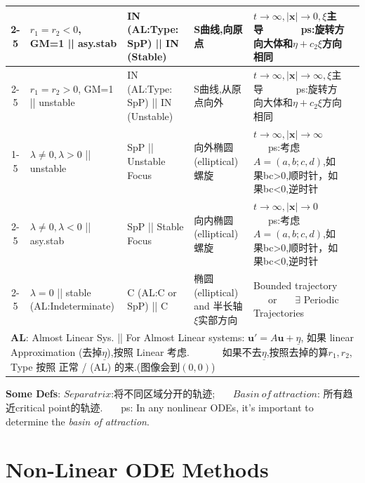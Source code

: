 \documentclass[8pt]{extarticle}
\begin{document}
\begin{longtable}{|c|l|l|l|l|l|}
    \cline{2-5}
    & {\scriptsize $r_1=r_2<0$, {\tiny GM=1} || {\tiny asy.stab}} &  IN {\tiny(AL:Type: SpP)} || {\scriptsize IN {\tiny (Stable)}} & {\scriptsize S曲线,向原点} & {\scriptsize $t\to\infty,|\mathbf{x}|\to0,\xi$主导 \ \ \ \ \ \ ps:旋转方向大体和$\eta+c_2\xi$方向相同} & \\
    \cline{2-5}
    & {\scriptsize $r_1=r_2>0$, {\tiny GM=1} || {\tiny unstable}} &  IN {\tiny(AL:Type: SpP)} || {\scriptsize IN {\tiny (Unstable)}} & {\scriptsize S曲线,从原点向外} & {\scriptsize $t\to\infty,|\mathbf{x}|\to\infty,\xi$主导 \ \ \ \ \ \ ps:旋转方向大体和$\eta+c_2\xi$方向相同} & \\
    \cline{1-5}
    \multirow{3}{*}{$\mathbb{C}$} & {\scriptsize $\lambda\ne0,\lambda>0$ || unstable} &  SpP || Unstable Focus & {\scriptsize 向外椭圆(elliptical)螺旋} & {\scriptsize $t\to\infty,|\mathbf{x}|\to\infty$ \ \ \ {\tiny ps:考虑$A=(a,b;c,d)$,如果bc>0,顺时针，如果bc<0,逆时针}} & \\
    \cline{2-5}
    & {\scriptsize $\lambda\ne0,\lambda<0$ || asy.stab} &  SpP || Stable Focus & {\scriptsize 向内椭圆(elliptical)螺旋} & {\scriptsize $t\to\infty,|\mathbf{x}|\to0$ \ \ \ {\tiny ps:考虑$A=(a,b;c,d)$,如果bc>0,顺时针，如果bc<0,逆时针}} & \\
    \cline{2-5}
    & {\scriptsize $\lambda=0$ || stable {\tiny (AL:Indeterminate)}} &  C {\scriptsize (AL:C or SpP)} || C & {\scriptsize 椭圆(elliptical) and 半长轴$\xi$实部方向} & {\scriptsize Bounded trajectory \ \ \ or \ \ \ $\exists$ Periodic Trajectories} & \\
    \hline
    \multicolumn{6}{|l|}{\textbf{AL}: Almost Linear Sys. || For Almost Linear systems: $\mathbf{u}'=A\mathbf{u}+\underline{\eta}$, 如果 linear Approximation (去掉$\underline{\eta}$),按照 Linear 考虑. \ \ \ \ \ \ 如果不去$\underline{\eta}$,按照去掉的算$r_1,r_2$, Type 按照 正常 / (AL) 的来.{\tiny(图像会到$(0,0)$)}} \\
    \hline
\end{longtable}
\vspace{-0.4cm}

\textbf{Some Defs}: {\scriptsize $Separatrix$:将不同区域分开的轨迹; \ \ \ $Basin \ of \ attraction$: 所有趋近critical point的轨迹.} \ \ \ {\tiny ps: In any nonlinear ODEs, it's important to determine the \textit{basin of attraction}.}


\section{Non-Linear ODE Methods}
\end{document}
